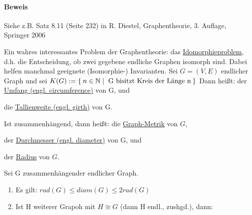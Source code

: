 \documentclass{../../meta/tudscript}
\begin{document}
        \paragraph{Beweis}
            Siehe z.B. Satz 8.11 (Seite 232) in R. Diestel, Graphentheorie, 3. Auflage, Springer 2006
            
            Ein wahres interessantes Problem der Graphentheorie: das
            \underline{Idomorphieproblem}, d.h. die Entscheidung, ob zwei gegebene
            endliche Graphen isomorph sind. Dabei helfen manchmal geeignete (Isomorphie-)
            Invarianten. 
        Sei $G = (V, E)$ endlicher Graph und sei $K (G) := \Set{n \in \mathbb{N}\mid \text{ G bisitzt Kreis der Länge n}}$
        Dann heißt:
        der \underline{Umfang (engl. circumference)} von G, und
        
        die \underline{Tallienweite (engl. girth)} von G.

        Ist zusammenhängend, dann heißt:
        die \underline{Graph-Metrik} von $G$,
        
        
        der \underline{Durchmesser (engl. diameter)} von G, und
        
        
        der \underline{Radius} von $G$.
        
        Sei G zusammenhängender endlicher Graph.
        \begin{enumerate}
            \item Es gilt: $rad (G) \leq diam (G) \leq 2 rad (G)$
            \item Ist H weiterer Grapoh mit $H \cong G$ (dann H endl., zushgd.), dann:
        \end{enumerate}        
        
\end{document}
